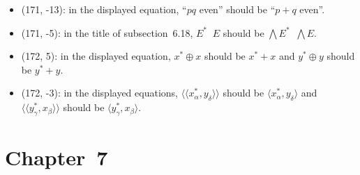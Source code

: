 \documentclass[letterpaper,12pt]{article}
\newcommand{\dsum}{\oplus}
\newcommand{\stprod}{\mathop{\widehat{\otimes}}}
\newcommand{\bigeprod}{\bigwedge}
\newcommand{\sprod}[2]{\langle#1,#2\rangle}
\newcommand{\ssprod}[2]{\langle\!\langle#1,#2\rangle\!\rangle}
\begin{document}
\begin{itemize}
\item (171, -13): in the displayed equation, ``\(pq\) even'' should be ``\(p+q\) even''.
\item (171, -5): in the title of subsection~6.18, \(E^*\stprod E\) should be \(\bigeprod E^*\stprod\bigeprod E\).
\item (172, 5): in the displayed equation, \(x^*\dsum x\) should be \(x^*+x\) and \(y^*\dsum y\) should be \(y^*+y\).
\item (172, -3): in the displayed equations, \(\ssprod{x^*_{\alpha}}{y_{\delta}}\) should be \(\sprod{x^*_{\alpha}}{y_{\delta}}\) and \(\ssprod{y^*_{\gamma}}{x_{\beta}}\) should be \(\sprod{y^*_{\gamma}}{x_{\beta}}\).
\end{itemize}

\section*{Chapter~7}
\end{document}
